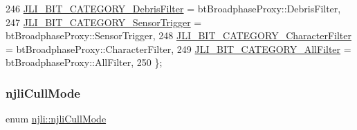 \begin{DoxyCode}
246     \mbox{\hyperlink{namespacenjli_af7b302a2b48bb644f85c88080925c974a9927ed54cec6c01b1adc76547240a391}{JLI\_BIT\_CATEGORY\_DebrisFilter}} = btBroadphaseProxy::DebrisFilter,
247     \mbox{\hyperlink{namespacenjli_af7b302a2b48bb644f85c88080925c974a95f7a2b44182a986ab43990e62ce56db}{JLI\_BIT\_CATEGORY\_SensorTrigger}} = btBroadphaseProxy::SensorTrigger,
248     \mbox{\hyperlink{namespacenjli_af7b302a2b48bb644f85c88080925c974a5dd354e999e7363281a2b6e10d591845}{JLI\_BIT\_CATEGORY\_CharacterFilter}} = btBroadphaseProxy::CharacterFilter,
249     \mbox{\hyperlink{namespacenjli_af7b302a2b48bb644f85c88080925c974a0fba80cad161dda96de5cbda9091cdce}{JLI\_BIT\_CATEGORY\_AllFilter}} = btBroadphaseProxy::AllFilter,
250   \};
\end{DoxyCode}
\mbox{\label{namespacenjli_a2247adafa5de18bc18550918b4ed48d8}} 
\subsubsection{\texorpdfstring{njli\+Cull\+Mode}{njliCullMode}}
{\footnotesize\ttfamily enum \mbox{\hyperlink{namespacenjli_a2247adafa5de18bc18550918b4ed48d8}{njli\+::njli\+Cull\+Mode}}}

